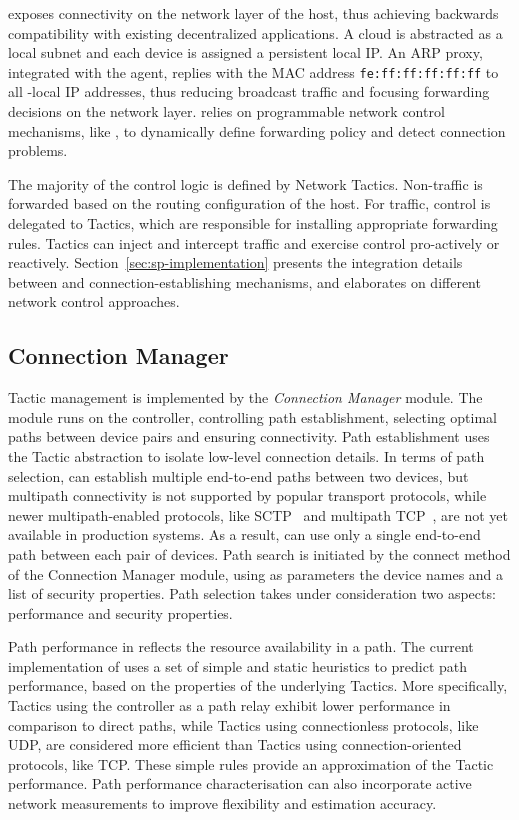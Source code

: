 \signpost exposes connectivity on the network layer of the host, thus achieving
backwards compatibility with existing decentralized applications. A \signpost
cloud is abstracted as a local subnet and each device is assigned a persistent
local IP\@. An ARP proxy, integrated with the \signpost agent,
replies with the MAC address \texttt{fe:ff:ff:ff:ff:ff}\/ to all \signpost-local
IP addresses, thus reducing broadcast traffic and focusing forwarding decisions
on the network layer.  \signpost relies on programmable network control
mechanisms, like \of, to dynamically define forwarding policy and
detect connection problems.

The majority of the \signpost control logic is defined by Network Tactics.
Non-\signpost traffic is forwarded based on the routing configuration of the
host.  For \signpost traffic, control is delegated to Tactics, which are
responsible for installing appropriate forwarding rules.  Tactics can inject
and intercept traffic and exercise control pro-actively or reactively.
Section~\ref{sec:sp-implementation} presents the  integration details between
\signpost and connection-establishing mechanisms, and elaborates on different
network control approaches.

\subsection{Connection Manager} \label{sec:sp-engine}

\signpost Tactic management is implemented by the \textit{Connection Manager}
module.  The module runs on the \signpost controller, controlling path
establishment, selecting optimal paths between device pairs and ensuring
connectivity.  Path establishment uses the Tactic abstraction to isolate
low-level connection details.  In terms of path selection, \signpost can
establish multiple end-to-end paths between two devices, but multipath
connectivity is not supported by popular transport protocols, while newer
multipath-enabled protocols, like SCTP~ and multipath
TCP~, are not yet available in production systems.  As a result,
\signpost can use only a single end-to-end path between each pair of devices.
Path search is initiated by the connect method of the Connection Manager module,
using as parameters the device names and a list of security properties. Path
selection takes under consideration two aspects: performance and security
properties.

Path performance in \signpost reflects the resource availability in a path. The
current implementation of \signpost uses a set of simple and static heuristics
to predict path performance, based on the properties of the underlying Tactics.
More specifically, Tactics using the \signpost controller as a path relay exhibit
lower performance in comparison to direct paths, while Tactics using
connectionless protocols, like UDP, are considered more efficient than Tactics
using connection-oriented protocols, like TCP\@.  These simple rules provide an
approximation of the Tactic performance.  Path performance characterisation can
also incorporate active network measurements to improve flexibility and
estimation accuracy. 

